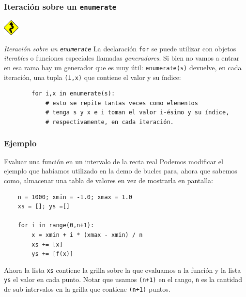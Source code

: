 \documentclass{beamer}
\begin{document}
\begin{frame}[fragile]
    \frametitle{Iteración sobre un \texttt{enumerate}}
    \includegraphics[height=0.8cm, width=0.8cm]{figuras/sin.png}
    \begin{block}{{\em Iteración sobre un \texttt{enumerate}}}
    La declaración \texttt{for} se puede utilizar con objetos {\em iterables} o funciones especiales llamadas {\em generadores}. Si bien no vamos a entrar en esa
    rama hay un generador que es muy útil: \texttt{enumerate(s)} devuelve, en cada iteración, una tupla \texttt{(i,x)} que contiene el valor y su índice:
    \begin{verbatim}
        for i,x in enumerate(s):
            # esto se repite tantas veces como elementos
            # tenga s y x e i toman el valor i-ésimo y su índice, 
            # respectivamente, en cada iteración.
    \end{verbatim}
    \end{block}
\end{frame}

\begin{frame}[fragile]
    \frametitle{Ejemplo}
    \begin{block}{Evaluar una función en un intervalo de la recta real}
    Podemos modificar el ejemplo que habíamos utilizado en la demo de bucles para, ahora que sabemos como, almacenar una tabla de valores
    en vez de mostrarla en pantalla:
    \begin{verbatim}
    n = 1000; xmin = -1.0; xmax = 1.0
    xs = []; ys =[]

    for i in range(0,n+1):
        x = xmin + i * (xmax - xmin) / n
        xs += [x]
        ys += [f(x)]

    \end{verbatim}
    Ahora la lista \texttt{xs} contiene la grilla sobre la que evaluamos a la función y la lista \texttt{ys} el valor
    en cada punto. Notar que usamos \texttt{(n+1)} en el rango, \texttt{n} es la cantidad de sub-intervalos en la grilla
    que contiene \texttt{(n+1)} puntos.
    \end{block}
    \end{frame}
\end{document}
